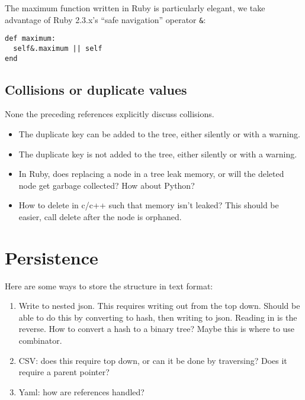 \documentclass{article}
\begin{document}
The maximum function written in Ruby is particularly elegant,
we take advantage of Ruby 2.3.x's ``safe navigation'' operator {\tt \&}:
\begin{lstlisting}[frame=single]
def maximum:
  self&.maximum || self
end
\end{lstlisting}

\subsection{Collisions or duplicate values}

None the preceding references explicitly discuss collisions.

\begin{itemize}
\item The duplicate key can be added to the tree, either silently or with a warning.
\item The duplicate key is not added to the tree, either silently or with a warning.

\item In Ruby, does replacing a node in a tree leak memory, or will the deleted node
get garbage collected? How about Python?

\item How to delete in c/c++ such that memory isn't leaked? This should be easier,
call delete after the node is orphaned.
\end{itemize}

\section{Persistence}

Here are some ways to store the structure in text format:

\begin{enumerate}
\item Write to nested json. This requires writing out from the top
down. Should be able to do this by converting to hash, then
writing to json. Reading in is the reverse. How to convert a
hash to a binary tree? Maybe this is where to use combinator.

\item CSV: does this require top down, or can it be done by traversing?
Does it require a parent pointer?

\item Yaml: how are references handled?
\end{enumerate}
\end{document}
